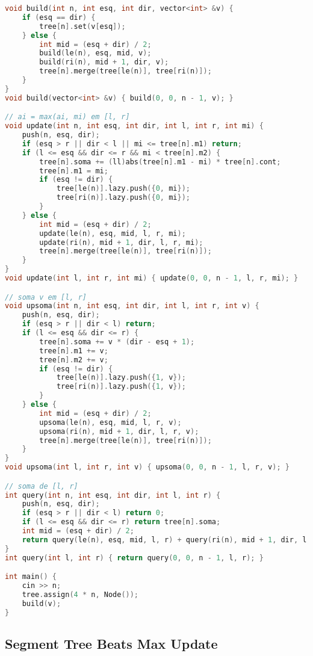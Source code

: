 \documentclass[10pt, a4paper, oneside]{book}
\begin{document}
\begin{lstlisting}[language=C++]
void build(int n, int esq, int dir, vector<int> &v) {
    if (esq == dir) {
        tree[n].set(v[esq]);
    } else {
        int mid = (esq + dir) / 2;
        build(le(n), esq, mid, v);
        build(ri(n), mid + 1, dir, v);
        tree[n].merge(tree[le(n)], tree[ri(n)]);
    }
}
void build(vector<int> &v) { build(0, 0, n - 1, v); }

// ai = max(ai, mi) em [l, r]
void update(int n, int esq, int dir, int l, int r, int mi) {
    push(n, esq, dir);
    if (esq > r || dir < l || mi <= tree[n].m1) return;
    if (l <= esq && dir <= r && mi < tree[n].m2) {
        tree[n].soma += (ll)abs(tree[n].m1 - mi) * tree[n].cont;
        tree[n].m1 = mi;
        if (esq != dir) {
            tree[le(n)].lazy.push({0, mi});
            tree[ri(n)].lazy.push({0, mi});
        }
    } else {
        int mid = (esq + dir) / 2;
        update(le(n), esq, mid, l, r, mi);
        update(ri(n), mid + 1, dir, l, r, mi);
        tree[n].merge(tree[le(n)], tree[ri(n)]);
    }
}
void update(int l, int r, int mi) { update(0, 0, n - 1, l, r, mi); }

// soma v em [l, r]
void upsoma(int n, int esq, int dir, int l, int r, int v) {
    push(n, esq, dir);
    if (esq > r || dir < l) return;
    if (l <= esq && dir <= r) {
        tree[n].soma += v * (dir - esq + 1);
        tree[n].m1 += v;
        tree[n].m2 += v;
        if (esq != dir) {
            tree[le(n)].lazy.push({1, v});
            tree[ri(n)].lazy.push({1, v});
        }
    } else {
        int mid = (esq + dir) / 2;
        upsoma(le(n), esq, mid, l, r, v);
        upsoma(ri(n), mid + 1, dir, l, r, v);
        tree[n].merge(tree[le(n)], tree[ri(n)]);
    }
}
void upsoma(int l, int r, int v) { upsoma(0, 0, n - 1, l, r, v); }

// soma de [l, r]
int query(int n, int esq, int dir, int l, int r) {
    push(n, esq, dir);
    if (esq > r || dir < l) return 0;
    if (l <= esq && dir <= r) return tree[n].soma;
    int mid = (esq + dir) / 2;
    return query(le(n), esq, mid, l, r) + query(ri(n), mid + 1, dir, l, r);
}
int query(int l, int r) { return query(0, 0, n - 1, l, r); }

int main() {
    cin >> n;
    tree.assign(4 * n, Node());
    build(v);
}
\end{lstlisting}
\hfill

\subsection{Segment Tree Beats Max Update}
\end{document}
